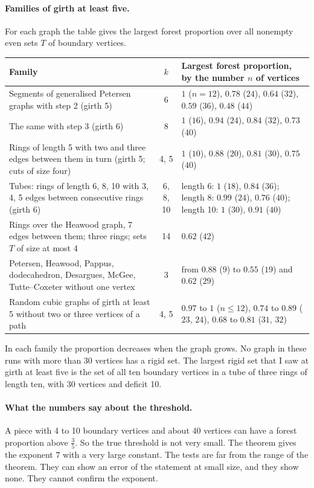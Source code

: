 \documentclass[11pt]{article}
\begin{document}
\paragraph{Families of girth at least five.} For each graph the table gives the largest forest
proportion over all nonempty even sets $T$ of boundary vertices.
\begin{center}
\small
\begin{tabular}{@{}p{6.1cm}cp{6.6cm}@{}}
\toprule
Family & $k$ & Largest forest proportion, by the number $n$ of vertices\\
\midrule
Segments of generalised Petersen graphs with step 2 (girth 5) & 6 &
$1$ ($n=12$), $0.78$ ($24$), $0.64$ ($32$), $0.59$ ($36$), $0.48$ ($44$)\\\addlinespace
The same with step 3 (girth 6) & 8 & $1$ ($16$), $0.94$ ($24$), $0.84$ ($32$), $0.73$ ($40$)\\\addlinespace
Rings of length 5 with two and three edges between them in turn (girth 5; cuts of size four) &
4, 5 & $1$ ($10$), $0.88$ ($20$), $0.81$ ($30$), $0.75$ ($40$)\\\addlinespace
Tubes: rings of length 6, 8, 10 with 3, 4, 5 edges between consecutive rings (girth 6) &
6, 8, 10 & length 6: $1$ ($18$), $0.84$ ($36$); length 8: $0.99$ ($24$), $0.76$ ($40$);
length 10: $1$ ($30$), $0.91$ ($40$)\\\addlinespace
Rings over the Heawood graph, 7 edges between them; three rings; sets $T$ of size at most 4 &
14 & $0.62$ ($42$)\\\addlinespace
Petersen, Heawood, Pappus, dodecahedron, Desargues, McGee, Tutte--Coxeter without one vertex &
3 & from $0.88$ ($9$) to $0.55$ ($19$) and $0.62$ ($29$)\\\addlinespace
Random cubic graphs of girth at least 5 without two or three vertices of a path & 4, 5 &
$0.97$ to $1$ ($n\le12$), $0.74$ to $0.89$ ($23$, $24$), $0.68$ to $0.81$ ($31$, $32$)\\
\bottomrule
\end{tabular}
\end{center}
In each family the proportion decreases when the graph grows. No graph in these runs with more
than 30 vertices has a rigid set. The largest rigid set that I saw at girth at least five is the
set of all ten boundary vertices in a tube of three rings of length ten, with 30 vertices and
deficit 10.

\paragraph{What the numbers say about the threshold.} A piece with 4 to 10 boundary vertices and
about 40 vertices can have a forest proportion above $\frac35$. So the true threshold is not
very small. The theorem gives the exponent $7$ with a very large constant. The tests are far
from the range of the theorem. They can show an error of the statement at small size, and they
show none. They cannot confirm the exponent.
\end{document}
